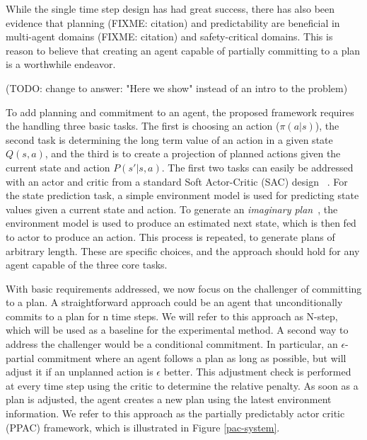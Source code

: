 \documentclass{article}
\begin{document}
        While the single time step design has had great success, there has also been evidence that planning (FIXME: citation) and predictability are beneficial in multi-agent domains (FIXME: citation) and safety-critical domains. This is reason to believe that creating an agent capable of partially committing to a plan is a worthwhile endeavor.
        
        
        (TODO: change to answer: "Here we show" instead of an intro to the problem)
        
        To add planning and commitment to an agent, the proposed framework requires the handling three basic tasks. The first is choosing an action (\(\pi(a | s)\)), the second task is determining the long term value of an action in a given state \(Q(s,a)\), and the third is to create a projection of planned actions given the current state and action \(P(s' | s,a)\). The first two tasks can easily be addressed with an actor and critic from a standard Soft Actor-Critic (SAC) design ~\cite{haarnoja2018soft}. For the state prediction task, a simple environment model is used for predicting state values given a current state and action. To generate an \textit{imaginary plan}~\cite{racaniere2017imagination}, the environment model is used to produce an estimated next state, which is then fed to actor to produce an action. This process is repeated, to generate plans of arbitrary length. These are specific choices, and the approach should hold for any agent capable of the three core tasks.
        
        With basic requirements addressed, we now focus on the challenger of committing to a plan. A straightforward approach could be an agent that unconditionally commits to a plan for n time steps. We will refer to this approach as N-step, which will be used as a baseline for the experimental method. A second way to address the challenger would be a conditional commitment. In particular, an $\epsilon$-partial commitment where an agent follows a plan as long as possible, but will adjust it if an unplanned action is $\epsilon$ better. This adjustment check is performed at every time step using the critic to determine the relative penalty. As soon as a plan is adjusted, the agent creates a new plan using the latest environment information. We refer to this approach as the partially predictably actor critic (PPAC) framework, which is illustrated in Figure \ref{pac-system}.
        
\end{document}
